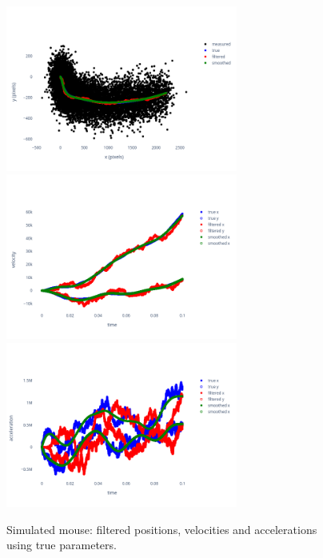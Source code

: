 \documentclass[12pt]{article}
\begin{document}
\begin{figure}
    \begin{center}

        \href{http://www.gatsby.ucl.ac.uk/~rapela/fwg/reports/learning/figures/46884517_pos_smoothed.html}{\includegraphics[width=3in]{figures/46884517_pos_smoothed.png}}
        \href{http://www.gatsby.ucl.ac.uk/~rapela/fwg/reports/learning/figures/46884517_vel_smoothed.html}{\includegraphics[width=3in]{figures/46884517_vel_smoothed.png}}
        \href{http://www.gatsby.ucl.ac.uk/~rapela/fwg/reports/learning/figures/46884517_acc_smoothed.html}{\includegraphics[width=3in]{figures/46884517_acc_smoothed.png}}

        \caption{Simulated mouse: filtered positions, velocities and accelerations using true parameters.}

        \label{fig:simulations_trueParams}

    \end{center}
\end{figure}
\end{document}
